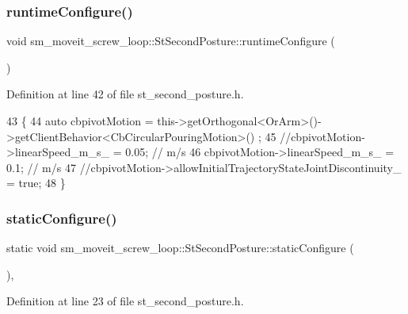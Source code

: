 \subsubsection{\texorpdfstring{runtime\+Configure()}{runtimeConfigure()}}
{\footnotesize\ttfamily void sm\+\_\+moveit\+\_\+screw\+\_\+loop\+::\+St\+Second\+Posture\+::runtime\+Configure (\begin{DoxyParamCaption}{ }\end{DoxyParamCaption})\hspace{0.3cm}{\ttfamily [inline]}}



Definition at line 42 of file st\+\_\+second\+\_\+posture.\+h.


\begin{DoxyCode}
43         \{
44             \textcolor{keyword}{auto} cbpivotMotion = this->getOrthogonal<OrArm>()->getClientBehavior<CbCircularPouringMotion>()
      ;
45             \textcolor{comment}{//cbpivotMotion->linearSpeed\_m\_s\_ = 0.05; // m/s}
46             cbpivotMotion->linearSpeed\_m\_s\_ = 0.1; \textcolor{comment}{// m/s}
47             \textcolor{comment}{//cbpivotMotion->allowInitialTrajectoryStateJointDiscontinuity\_ = true;}
48         \}
\end{DoxyCode}
\mbox{\label{structsm__moveit__screw__loop_1_1StSecondPosture_a704c12b1f6ee40039fa1c6f1e3ec0ba4}} 
\subsubsection{\texorpdfstring{static\+Configure()}{staticConfigure()}}
{\footnotesize\ttfamily static void sm\+\_\+moveit\+\_\+screw\+\_\+loop\+::\+St\+Second\+Posture\+::static\+Configure (\begin{DoxyParamCaption}{ }\end{DoxyParamCaption})\hspace{0.3cm}{\ttfamily [inline]}, {\ttfamily [static]}}



Definition at line 23 of file st\+\_\+second\+\_\+posture.\+h.



